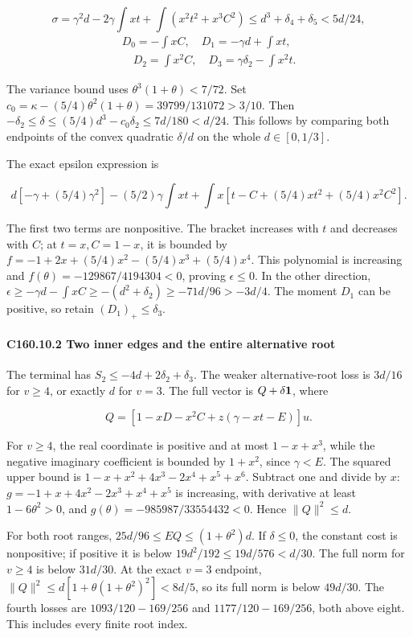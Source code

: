 \[
\sigma=\gamma^2d-2\gamma\int xt+\int(x^2t^2+x^3C^2)
\le d^3+\delta_4+\delta_5<5d/24,
\]
\[
\begin{gathered}
D_0=-\int xC,\quad D_1=-\gamma d+\int xt,\\
\quad D_2=\int x^2C,\quad D_3=\gamma \delta_2-\int x^2t.
\end{gathered}
\]

The variance bound uses \(\theta^3(1+\theta)<7/72\). Set \(c_0=\kappa-(5/4)\theta^2(1+\theta)=39799/131072>3/10\). Then \(-\delta_2\le\delta\le(5/4)d^3-c_0\delta_2\le7d/180<d/24\). This follows by comparing both endpoints of the convex quadratic \(\delta/d\) on the whole \(d\in[0,\allowbreak \allowbreak  1/3]\).

The exact epsilon expression is

\[
d[-\gamma+(5/4)\gamma^2]-(5/2)\gamma\int xt
+\int x[t-C+(5/4)xt^2+(5/4)x^2C^2].
\]

The first two terms are nonpositive. The bracket increases with \(t\) and decreases with \(C\); at \(t=x,\allowbreak \allowbreak  C=1-x\), it is bounded by \(f=-1+2x+(5/4)x^2-(5/4)x^3+(5/4)x^4\). This polynomial is increasing and \(f(\theta)=-129867/4194304<0\), proving \(\epsilon\le0\). In the other direction, \(\epsilon\ge-\gamma d-\int xC\ge-(d^2+\delta_2)\ge-71d/96>-3d/4\). The moment \(D_1\) can be positive, so retain \((D_1)_+\le \delta_3\).

\paragraph{C160.10.2 Two inner edges and the entire alternative root}

The terminal has \(S_2\le-4d+2\delta_2+\delta_3\). The weaker alternative-root loss is \(3d/16\) for \(v\ge4\), or exactly \(d\) for \(v=3\). The full vector is \(Q+\delta\mathbf1\), where

\[
Q=[1-xD-x^2C+z(\gamma-xt-E)]u.
\]

For \(v\ge4\), the real coordinate is positive and at most \(1-x+x^3\), while the negative imaginary coefficient is bounded by \(1+x^2\), since \(\gamma<E\). The squared upper bound is \(1-x+x^2+4x^3-2x^4+x^5+x^6\). Subtract one and divide by \(x\): \(g=-1+x+4x^2-2x^3+x^4+x^5\) is increasing, with derivative at least \(1-6\theta^2>0\), and \(g(\theta)=-985987/33554432<0\). Hence \(\|Q\|^2\le d\).

For both root ranges, \(25d/96\le EQ\le(1+\theta^2)d\). If \(\delta\le0\), the constant cost is nonpositive; if positive it is below \(19d^2/192\le19d/576<d/30\). The full norm for \(v\ge4\) is below \(31d/30\). At the exact \(v=3\) endpoint, \(\|Q\|^2\le d[1+\theta(1+\theta^2)^2]<8d/5\), so its full norm is below \(49d/30\). The fourth losses are \(1093/120-169/256\) and \(1177/120-169/256\), both above eight. This includes every finite root index.

